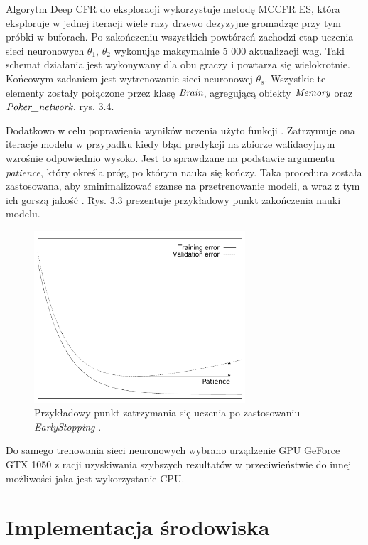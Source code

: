 \documentclass[12pt,oneside,a4paper]{report}
\begin{document}
Algorytm Deep CFR do eksploracji wykorzystuje metodę MCCFR ES, która eksploruje w jednej iteracji
wiele razy drzewo dezyzyjne gromadząc przy tym próbki w buforach.
Po zakończeniu 
wszystkich powtórzeń zachodzi etap uczenia sieci neuronowych $\theta_{1}$, $\theta_{2}$
wykonując maksymalnie 5 000 aktualizacji wag.
Taki schemat działania jest wykonywany dla obu graczy i powtarza się wielokrotnie. Końcowym
zadaniem jest wytrenowanie sieci neuronowej $\theta_{s}$.  
Wszystkie te elementy zostały połączone przez klasę $\emph{Brain}$, agregującą obiekty
$\emph{Memory}$
oraz $\emph{Poker\_network}$, rys. 3.4. 

Dodatkowo w celu poprawienia wyników uczenia użyto funkcji  \cite{tensorflow}.
Zatrzymuje ona iteracje modelu w przypadku kiedy błąd predykcji na zbiorze
walidacyjnym wzrośnie odpowiednio wysoko. Jest to sprawdzane na podstawie argumentu \emph{patience},
który określa próg, po którym nauka się kończy. Taka procedura została zastosowana, aby
zminimalizować szanse na przetrenowanie modeli, a wraz z tym ich gorszą jakość \cite{early}.
Rys. 3.3 prezentuje przykładowy punkt zakończenia nauki modelu.

\begin{figure}[!ht]
  \centering
  \includegraphics[width=0.7\textwidth]{./img/early.pdf}
  \caption{Przykładowy punkt zatrzymania się uczenia po zastosowaniu \emph{EarlyStopping} \cite{early}.}
\end{figure}

\vspace{2cm}
Do samego trenowania sieci neuronowych wybrano urządzenie GPU GeForce GTX 1050 z 
racji uzyskiwania szybszych
rezultatów w przeciwieństwie do innej możliwości jaka jest wykorzystanie CPU.


\section{Implementacja środowiska}
\end{document}
